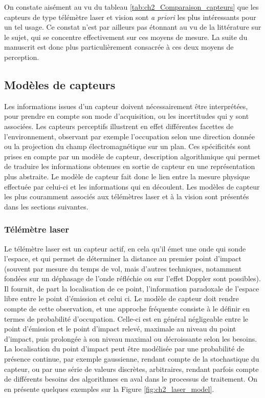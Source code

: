 On constate aisément au vu du tableau \ref{tab:ch2_Comparaison_capteurs} que les capteurs de type \og télémètre laser\fg{} et \og vision\fg{} sont \textit{a priori} les plus intéressants pour un tel usage. Ce constat n'est par ailleurs pas étonnant au vu de la littérature sur le sujet, qui se concentre effectivement sur ces moyens de mesure. La suite du manuscrit est donc plus particulièrement consacrée à ces deux moyens de perception.

\subsection{Modèles de capteurs}
Les informations issues d'un capteur doivent nécessairement être interprétées, pour prendre en compte son mode d'acquisition, ou les incertitudes qui y sont associées. Les capteurs perceptifs illustrent en effet différentes facettes de l'environnement, observant par exemple l'occupation selon une direction donnée ou la projection du champ électromagnétique sur un plan. Ces spécificités sont prises en compte par un modèle de capteur, description algorithmique qui permet de traduire les informations obtenues en sortie de capteur en une représentation plus abstraite. Le modèle de capteur fait donc le lien entre la mesure physique effectuée par celui-ci et les informations qui en découlent. Les modèles de capteur les plus couramment associés aux télémètres laser et à la vision sont présentés dans les sections suivantes.

\subsubsection{Télémètre laser} \label{sec:ch2_Modèle_laser}
Le télémètre laser est un capteur actif, en cela qu'il émet une onde qui \og sonde\fg{} l'espace, et qui permet de déterminer la distance au premier point d'impact (souvent par mesure du temps de vol, mais d'autres techniques, notamment fondées sur un déphasage de l'onde réfléchie ou sur l'effet Doppler sont possibles). Il fournit, de part la localisation de ce point, l'information paradoxale de l'espace libre entre le point d'émission et celui ci. Le modèle de capteur doit rendre compte de cette observation, et une approche fréquente consiste à le définir en termes de probabilité d'occupation. Celle-ci est en général négligeable entre le point d'émission et le point d'impact relevé, maximale au niveau du point d'impact, puis prolongée à son niveau maximal ou décroissante selon les besoins. La localisation du point d'impact peut être modélisée par une probabilité de présence continue, par exemple gaussienne, rendant compte de la stochastique du capteur, ou par une série de valeurs discrètes, arbitraires, rendant parfois compte de différents besoins des algorithmes en aval dans le processus de traitement. On en présente quelques exemples sur la Figure \ref{fig:ch2_laser_model}.

